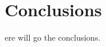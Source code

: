 %
%
\let\textcircled=\pgftextcircled
\chapter{Conclusions}
\label{chap:con}
ere will go the conclusions.